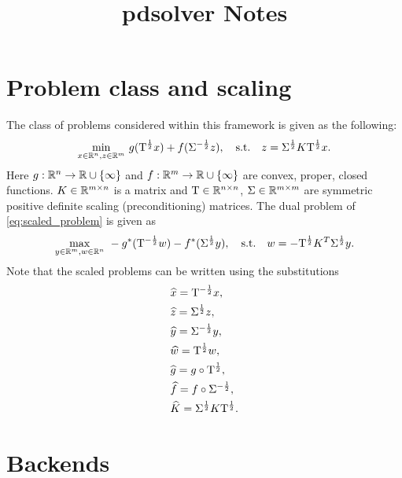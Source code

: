 \documentclass[english,11pt,a4paper]{article}
\title{pdsolver Notes}
\begin{document}
\maketitle

\section{Problem class and scaling}
The class of problems considered within this framework is given as the following:
\begin{equation}
  \underset{x \in \mathbb{R}^n, z \in \mathbb{R}^m} \min ~ g( \mathrm{T}^{\frac{1}{2}} x) + f(\Sigma^{-\frac{1}{2}} z), \quad \text{s.t.} \quad z = \Sigma^{\frac{1}{2}} K \mathrm{T}^{\frac{1}{2}} x.
  \label{eq:scaled_problem}
\end{equation}
Here $g : \mathbb{R}^n \to \mathbb{R} \cup \{ \infty \}$ and $f : \mathbb{R}^m \to \mathbb{R} \cup \{ \infty \}$ are convex, proper, closed functions. $K \in \mathbb{R}^{m \times n}$ is a matrix and $\mathrm{T} \in \mathbb{R}^{n \times n}$, $\Sigma \in \mathbb{R}^{m \times m}$ are symmetric positive definite scaling (preconditioning) matrices. The dual problem of \eqref{eq:scaled_problem} is given as
\begin{equation}
  \underset{y \in \mathbb{R}^m, w \in \mathbb{R}^n} \max ~ -g^*(\mathrm{T}^{-\frac{1}{2}} w) - f^*(\Sigma^{\frac{1}{2}} y), \quad \text{s.t.} \quad w=-\mathrm{T}^{\frac{1}{2}} K^T \Sigma^{\frac{1}{2}} y.
  \label{eq:scaled_dual_problem}
\end{equation}
Note that the scaled problems can be written using the substitutions
\begin{equation}
  \begin{aligned}
    &\widehat x = \mathrm{T}^{-\frac{1}{2}} x, \\
    &\widehat z = \Sigma^{\frac{1}{2}} z, \\
    &\widehat y = \Sigma^{-\frac{1}{2}} y, \\
    &\widehat w = \mathrm{T}^{\frac{1}{2}} w, \\
    &\widehat g = g \circ \mathrm{T}^{\frac{1}{2}}, \\
    &\widehat f = f \circ \Sigma^{-\frac{1}{2}}, \\
    &\widehat K = \Sigma^{\frac{1}{2}} K \mathrm{T}^{\frac{1}{2}}.
  \end{aligned}
\end{equation}

\section{Backends}
\end{document}
